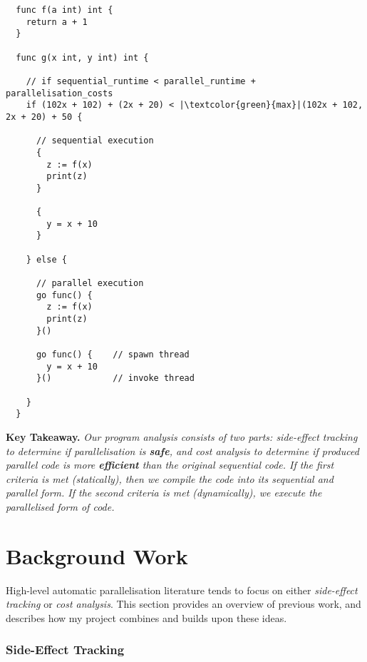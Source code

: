 
\begin{verbatim}
  func f(a int) int { 
    return a + 1
  }

  func g(x int, y int) int { 

    // if sequential_runtime < parallel_runtime + parallelisation_costs
    if (102x + 102) + (2x + 20) < |\textcolor{green}{max}|(102x + 102, 2x + 20) + 50 {

      // sequential execution 
      {
        z := f(x)
        print(z)
      }

      {
        y = x + 10
      }

    } else { 

      // parallel execution 
      go func() { 
        z := f(x)
        print(z)
      }()

      go func() {    // spawn thread 
        y = x + 10
      }()            // invoke thread 

    }
  }
\end{verbatim}

\textbf{Key Takeaway.} \textit{Our program analysis consists of two parts: side-effect tracking to determine if parallelisation is \textbf{safe}, and cost analysis to determine if produced parallel code is more \textbf{efficient} than the original sequential code. If the first criteria is met (statically), then we compile the code into its sequential and parallel form. If the second criteria is met (dynamically), we execute the parallelised form of code.}


\section{Background Work}

\label{sec:2.2}

High-level automatic parallelisation literature tends to focus on either \textit{side-effect tracking} or \textit{cost analysis}. This section provides an overview of previous work, and describes how my project combines and builds upon these ideas.

\newpage

\vspace{-3mm}

\subsubsection*{Side-Effect Tracking}

\vspace{-2mm}

